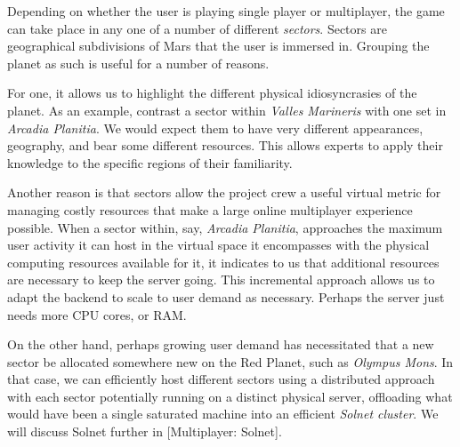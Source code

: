 

Depending on whether the user is playing single player or multiplayer, the game can take place in any one of a number of different {\it sectors}. Sectors are geographical subdivisions of Mars that the user is immersed in. Grouping the planet as such is useful for a number of reasons.

For one, it allows us to highlight the different physical idiosyncrasies of the planet. As an example, contrast a sector within {\it Valles Marineris} with one set in {\it Arcadia Planitia}. We would expect them to have very different appearances, geography, and bear some different resources. This allows experts to apply their knowledge to the specific regions of their familiarity.

Another reason is that sectors allow the project crew a useful virtual metric for managing costly resources that make a large online multiplayer experience possible. When a sector within, say, {\it Arcadia Planitia}, approaches the maximum user activity it can host in the virtual space it encompasses with the physical computing resources available for it, it indicates to us that additional resources are necessary to keep the server going. This incremental approach allows us to adapt the backend to scale to user demand as necessary. Perhaps the server just needs more CPU cores, or RAM. 

On the other hand, perhaps growing user demand has necessitated that a new sector be allocated somewhere new on the Red Planet, such as {\it Olympus Mons}. In that case, we can efficiently host different sectors using a distributed approach with each sector potentially running on a distinct physical server, offloading what would have been a single saturated machine into an efficient {\it Solnet cluster}. We will discuss Solnet further in [Multiplayer: Solnet].

